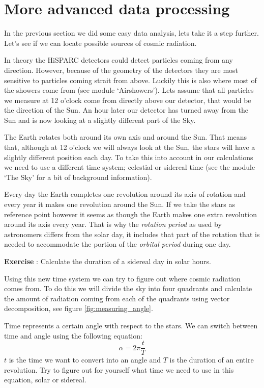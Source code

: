 \documentclass[12pt,a4paper]{article}
\numberwithin{equation}{section}
\numberwithin{figure}{section}
\newcounter{Exercise}
\numberwithin{table}{section}
\begin{document}
\section{More advanced data processing}
In the previous section we did some easy data analysis, lets take it a step further. Let's see if we can locate possible sources of cosmic radiation.

In theory the HiSPARC detectors could detect particles coming from any direction. However, because of the geometry of the detectors they are most sensitive to particles coming strait from above. Luckily this is also where most of the showers come from (see module `Airshowers'). Lets assume that all particles we measure at 12 o'clock come from directly above our detector, that would be the direction of the Sun. An hour later our detector has turned away from the Sun and is now looking at a slightly different part of the Sky. 

The Earth rotates both around its own axis and around the Sun. That means that, although at 12 o'clock we will always look at the Sun, the stars will have a slightly different position each day. To take this into account in our calculations we need to use a different time system; celestial or sidereal time (see the module `The Sky' for a bit of background information). 

Every day the Earth completes one revolution around its axis of rotation and every year it makes one revolution around the Sun. If we take the stars as reference point however it seems as though the Earth makes one extra revolution around its axis every year. That is why the \textit{rotation period} as used by astronomers differs from the solar day, it includes that part of the rotation that is needed to accommodate the portion of the \textit{orbital period} during one day.

\begin{shaded}
\textbf{Exercise \theExercise {}} : Calculate the duration of a sidereal day in solar hours.\end{shaded}

Using this new time system we can try to figure out where cosmic radiation comes from. To do this we will divide the sky into four quadrants and calculate the amount of radiation coming from each of the quadrants using vector decomposition, see figure \ref{fig:measuring_angle}.

Time represents a certain angle with respect to the stars. We can switch between time and angle using the following equation:
\begin{equation} \alpha = 2 \pi \frac{t}{T} \label{eq:time} \end{equation}
$t$ is the time we want to convert into an angle and $T$ is the duration of an entire revolution. Try to figure out for yourself what time we need to use in this equation, solar or sidereal.
\end{document}
